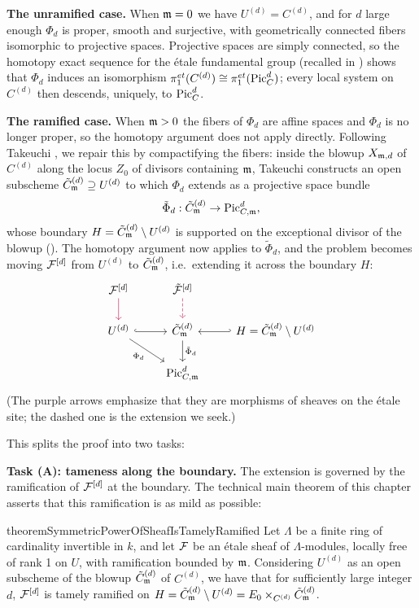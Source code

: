 \textbf{The unramified case.} When $\mdls = 0$ we have $U^{(d)} = C^{(d)}$,
and for $d$ large enough $\Phi_d$ is proper, smooth and surjective, with
geometrically connected fibers isomorphic to projective spaces. Projective
spaces are simply connected, so the homotopy exact sequence for the \'etale
fundamental group (recalled in ) shows that
$\Phi_d$ induces an isomorphism $\pi_1^{et}(C^{(d)}) \cong
\pi_1^{et}(\PicC[d])$; every local system on $C^{(d)}$ then descends,
uniquely, to $\PicC[d]$.

\textbf{The ramified case.} When $\mdls > 0$ the fibers of $\Phi_d$ are
affine spaces and $\Phi_d$ is no longer proper, so the homotopy argument does
not apply directly. Following Takeuchi \cite{takeuchi2019blow}, we repair
this by compactifying the fibers: inside the blowup $X_{\mdls,d}$ of
$C^{(d)}$ along the locus $Z_0$ of divisors containing $\mdls$, Takeuchi
constructs an open subscheme $\Cmod{d} \supseteq U^{(d)}$ to which $\Phi_d$
extends as a projective space bundle
$$ \tilde{\Phi}_d : \Cmod{d} \to \PicCm[d], $$
whose boundary $H = \Cmod{d} \setminus U^{(d)}$ is supported on the
exceptional divisor of the blowup ().
The homotopy argument now applies to $\tilde{\Phi}_d$, and the problem
becomes moving $\cF^{[d]}$ from $U^{(d)}$ to $\Cmod{d}$, i.e.\ extending it
across the boundary $H$:
\[
\begin{tikzcd}
\cF^{[d]} \arrow[d, purple] & \tilde{\cF}^{[d]} \arrow[d, purple, dashed] & \\
U^{(d)} \arrow[r, hook] \arrow[rd, "\Phi_d"'] & \Cmod{d} \arrow[d, "\tilde{\Phi}_d"] & H = \Cmod{d} \setminus U^{(d)} \arrow[l, hook'] \\
& \PicCm[d] &
\end{tikzcd}
\]
(The purple arrows emphasize that they are morphisms of sheaves on the
\'etale site; the dashed one is the extension we seek.)

This splits the proof into two tasks:

\textbf{Task (A): tameness along the boundary.} The extension is governed by
the ramification of $\cF^{[d]}$ at the boundary. The technical main theorem
of this chapter asserts that this ramification is as mild as possible:

\begin{restatable}{theorem}{SymmetricPowerOfSheafIsTamelyRamified}\label{theorem:SymmetricPowerOfSheafIsTamelyRamified}
     Let $\Lambda$ be a finite ring of cardinality invertible in $k$, and let $\cF$ be an \'etale sheaf of $\Lambda$-modules, locally free of rank 1 on $U$, with ramification bounded by $\mdls$.
     Considering $U^{(d)}$ as an open subscheme of the blowup $\tilde{C}^{(d)}_\mdls$ of $C^{(d)}$, we have that
     for sufficiently large integer $d$, $\cF^{[d]}$ is tamely ramified on $H= \tilde{C}^{(d)}_\mdls \setminus U^{(d)}=E_0 \times_{C^{(d)}} \tilde{C}^{(d)}_\mdls $.
\end{restatable}

